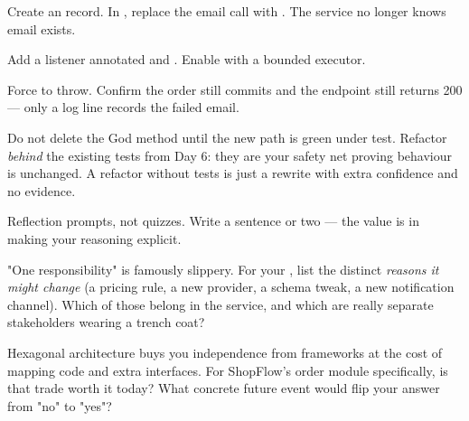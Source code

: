 Create an  record. In , replace the email call with . The service no longer knows email exists.

Add a listener annotated  and . Enable  with a bounded executor.

Force  to throw. Confirm the order still commits and the endpoint still returns 200 --- only a log line records the failed email.

\begin{prodtip}
Do not delete the God method until the new path is green under test. Refactor \emph{behind} the existing tests from Day 6: they are your safety net proving behaviour is unchanged. A refactor without tests is just a rewrite with extra confidence and no evidence.
\end{prodtip}


Reflection prompts, not quizzes. Write a sentence or two --- the value is in making your reasoning explicit.

\begin{thinkbox}
"One responsibility" is famously slippery. For your , list the distinct \emph{reasons it might change} (a pricing rule, a new provider, a schema tweak, a new notification channel). Which of those belong in the service, and which are really separate stakeholders wearing a trench coat?
\end{thinkbox}

\begin{thinkbox}
Hexagonal architecture buys you independence from frameworks at the cost of mapping code and extra interfaces. For ShopFlow's order module specifically, is that trade worth it today? What concrete future event would flip your answer from "no" to "yes"?
\end{thinkbox}

